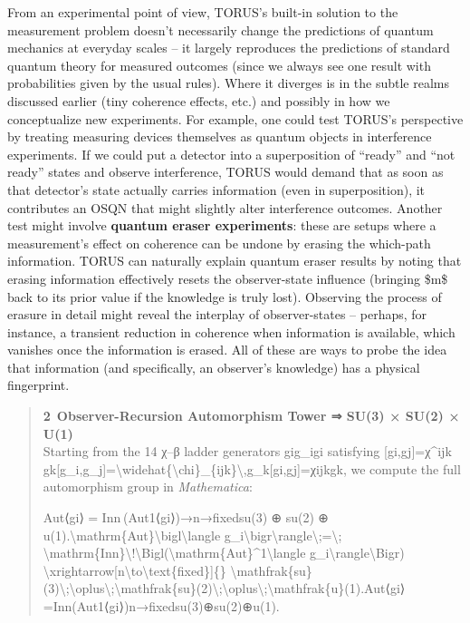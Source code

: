 \documentclass[]{article}
\begin{document}
From an experimental point of view, TORUS's built-in solution to the
measurement problem doesn't necessarily change the predictions of
quantum mechanics at everyday scales -- it largely reproduces the
predictions of standard quantum theory for measured outcomes (since we
always see one result with probabilities given by the usual rules).
Where it diverges is in the subtle realms discussed earlier (tiny
coherence effects, etc.) and possibly in how we conceptualize new
experiments. For example, one could test TORUS's perspective by treating
measuring devices themselves as quantum objects in interference
experiments. If we could put a detector into a superposition of
``ready'' and ``not ready'' states and observe interference, TORUS would
demand that as soon as that detector's state actually carries
information (even in superposition), it contributes an OSQN that might
slightly alter interference outcomes. Another test might involve
\textbf{quantum eraser experiments}: these are setups where a
measurement's effect on coherence can be undone by erasing the
which-path information. TORUS can naturally explain quantum eraser
results by noting that erasing information effectively resets the
observer-state influence (bringing \$m\$ back to its prior value if the
knowledge is truly lost). Observing the process of erasure in detail
might reveal the interplay of observer-states -- perhaps, for instance,
a transient reduction in coherence when information is available, which
vanishes once the information is erased. All of these are ways to probe
the idea that information (and specifically, an observer's knowledge)
has a physical fingerprint.

\begin{quote}
\textbf{2 Observer-Recursion Automorphism Tower ⇒ SU(3) × SU(2) ×
U(1)}\\
Starting from the 14 χ--β ladder generators gig\_igi​ satisfying
{[}gi,gj{]}=χ\^{}ijk gk{[}g\_i,g\_j{]}=\textbackslash{}widehat\{\textbackslash{}chi\}\_\{ijk\}\textbackslash{},g\_k{[}gi​,gj​{]}=χ​ijk​gk​,
we compute the full automorphism group in \emph{Mathematica}:

Aut⟨gi⟩  =  Inn ⁣(Aut1⟨gi⟩)→n→fixedsu(3)  ⊕  su(2)  ⊕  u(1).\textbackslash{}mathrm\{Aut\}\textbackslash{}bigl\textbackslash{}langle
g\_i\textbackslash{}bigr\textbackslash{}rangle\textbackslash{};=\textbackslash{};
\textbackslash{}mathrm\{Inn\}\textbackslash{}!\textbackslash{}Bigl(\textbackslash{}mathrm\{Aut\}\^{}1\textbackslash{}langle
g\_i\textbackslash{}rangle\textbackslash{}Bigr)
\textbackslash{}xrightarrow{[}n\textbackslash{}to\textbackslash{}text\{fixed\}{]}\{\}
\textbackslash{}mathfrak\{su\}(3)\textbackslash{};\textbackslash{}oplus\textbackslash{};\textbackslash{}mathfrak\{su\}(2)\textbackslash{};\textbackslash{}oplus\textbackslash{};\textbackslash{}mathfrak\{u\}(1).Aut⟨gi​⟩=Inn(Aut1⟨gi​⟩)n→fixed​su(3)⊕su(2)⊕u(1).
\end{quote}
\end{document}
